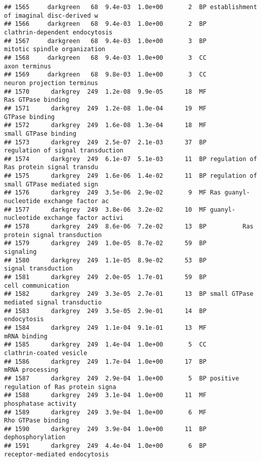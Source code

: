 \documentclass[]{article}
\begin{document}
\begin{verbatim}
## 1565     darkgreen   68  9.4e-03  1.0e+00       2  BP establishment of imaginal disc-derived w
## 1566     darkgreen   68  9.4e-03  1.0e+00       2  BP           clathrin-dependent endocytosis
## 1567     darkgreen   68  9.4e-03  1.0e+00       3  BP             mitotic spindle organization
## 1568     darkgreen   68  9.4e-03  1.0e+00       3  CC                            axon terminus
## 1569     darkgreen   68  9.8e-03  1.0e+00       3  CC               neuron projection terminus
## 1570      darkgrey  249  1.2e-08  9.9e-05      18  MF                       Ras GTPase binding
## 1571      darkgrey  249  1.2e-08  1.0e-04      19  MF                           GTPase binding
## 1572      darkgrey  249  1.6e-08  1.3e-04      18  MF                     small GTPase binding
## 1573      darkgrey  249  2.5e-07  2.1e-03      37  BP        regulation of signal transduction
## 1574      darkgrey  249  6.1e-07  5.1e-03      11  BP regulation of Ras protein signal transdu
## 1575      darkgrey  249  1.6e-06  1.4e-02      11  BP regulation of small GTPase mediated sign
## 1576      darkgrey  249  3.5e-06  2.9e-02       9  MF Ras guanyl-nucleotide exchange factor ac
## 1577      darkgrey  249  3.8e-06  3.2e-02      10  MF guanyl-nucleotide exchange factor activi
## 1578      darkgrey  249  8.6e-06  7.2e-02      13  BP          Ras protein signal transduction
## 1579      darkgrey  249  1.0e-05  8.7e-02      59  BP                                signaling
## 1580      darkgrey  249  1.1e-05  8.9e-02      53  BP                      signal transduction
## 1581      darkgrey  249  2.0e-05  1.7e-01      59  BP                       cell communication
## 1582      darkgrey  249  3.3e-05  2.7e-01      13  BP small GTPase mediated signal transductio
## 1583      darkgrey  249  3.5e-05  2.9e-01      14  BP                              endocytosis
## 1584      darkgrey  249  1.1e-04  9.1e-01      13  MF                             mRNA binding
## 1585      darkgrey  249  1.4e-04  1.0e+00       5  CC                  clathrin-coated vesicle
## 1586      darkgrey  249  1.7e-04  1.0e+00      17  BP                          mRNA processing
## 1587      darkgrey  249  2.9e-04  1.0e+00       5  BP positive regulation of Ras protein signa
## 1588      darkgrey  249  3.1e-04  1.0e+00      11  MF                     phosphatase activity
## 1589      darkgrey  249  3.9e-04  1.0e+00       6  MF                       Rho GTPase binding
## 1590      darkgrey  249  3.9e-04  1.0e+00      11  BP                        dephosphorylation
## 1591      darkgrey  249  4.4e-04  1.0e+00       6  BP            receptor-mediated endocytosis

\end{verbatim}
\end{document}
